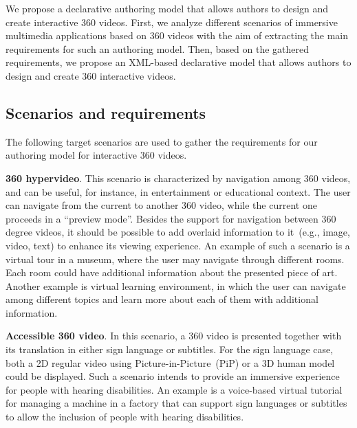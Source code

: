 We propose a declarative authoring model that allows authors to design and create interactive 360 videos.
First, we analyze different scenarios of immersive multimedia applications
based on 360 videos with the aim of extracting the main requirements for such
an authoring model.
Then, based on the gathered requirements, we propose an XML-based declarative
model that allows authors to design and create 360 interactive videos.


\subsection{Scenarios and requirements}
\label{subsec:authoring_scenarios}

The following target scenarios are used to gather the requirements for our
authoring model for interactive 360 videos.

\textbf{360 hypervideo}.
This scenario is characterized by navigation among 360 videos, and can be useful, for instance, in entertainment or educational context.
The user can navigate from the current to another 360 video, while the current
one proceeds in a ``preview mode''.
Besides the support for navigation between 360 degree videos, it should be
possible to add overlaid information to it~(e.g., image, video, text) to
enhance its viewing experience.
An example of such a scenario is a virtual tour in a museum, where the user
may navigate through different rooms.
Each room could have additional information about the presented piece of art.
Another example is virtual learning environment, in which the user can navigate among different topics and learn more about each of them with additional information.

\textbf{Accessible 360 video}. 
In this scenario, a 360 video is presented together with its translation in either sign language or subtitles.
For the sign language case, both a 2D regular video using Picture-in-Picture~(PiP) or a 3D human model could be displayed.
Such a scenario intends to provide an immersive experience for people with hearing disabilities.
An example is a voice-based virtual tutorial for managing a machine in a factory that can support sign languages or subtitles to allow the inclusion of people with hearing disabilities.

